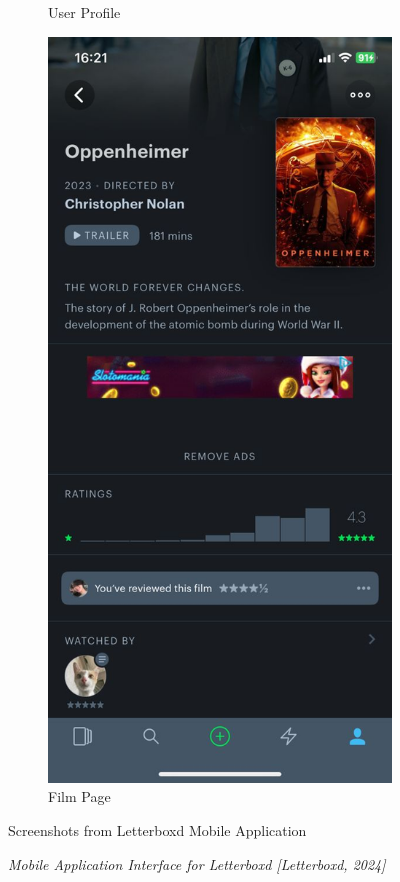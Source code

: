\begin{figure} [h]
\begin{subfigure}{.3\linewidth}
      \caption{User Profile}
      \label{fig:myfig15}
    \end{subfigure}%
    \hspace{1em}%
    \begin{subfigure}{.3\linewidth}
      \centering
      \includegraphics[width = \linewidth]{mainmatter/images/letterboxd3.jpg}
      \caption{Film Page}
      \label{fig:myfig16}
    \end{subfigure}
    \caption{Screenshots from Letterboxd Mobile Application}
    \caption*{\textit{Mobile Application Interface for Letterboxd [Letterboxd, 2024]}}
\end{figure}
